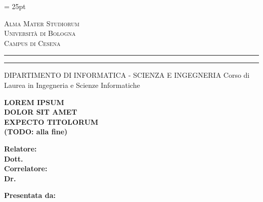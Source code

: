 \oddsidemargin = 25pt

\begin{titlepage}
    \begin{center}
    {
        {\Large{\textsc{Alma Mater Studiorum}}} \\
        {\Large{\textsc{Università di Bologna}}} \\
        {\textsc{Campus di Cesena}}
        \vspace{-1mm}
    }
    \end{center}
    \begin{center}
    {
        \rule[0.1cm]{\textwidth}{0.1mm}
        \rule[0.5cm]{\textwidth}{0.6mm}
        DIPARTIMENTO DI INFORMATICA - SCIENZA E INGEGNERIA
        Corso di Laurea in Ingegneria e Scienze Informatiche
    }
    \end{center}

    \vspace{2.25cm} %

    \begin{center}
        {\LARGE{\textbf{LOREM IPSUM}}} \\
        \vspace{0.4cm}
        {\LARGE{\textbf{DOLOR SIT AMET}}} \\
        \vspace{0.4cm}
        {\LARGE{\textbf{EXPECTO TITOLORUM}}} \\
        \vspace{0.4cm}
        {\LARGE{\textbf{(TODO: alla fine)}}}
    \end{center}

    \vspace{2.25cm} %
    \par
    \noindent
    \begin{minipage}[t]{0.47\textwidth}
        {\large{\textbf{Relatore:}}} \\
        {\large{\textbf{Dott. \xsupervisor}}}
        \vspace{5mm}
        {\large{\bf \\Correlatore:\\
        Dr. \xcorrelatore}}
    \end{minipage}
    \hfill
    \begin{minipage}[t]{0.47\textwidth}\raggedleft
        {\large{\textbf{Presentata da:} \\
        {\large{\textbf{\xstudent}}}}}
    \end{minipage}


\end{titlepage}
